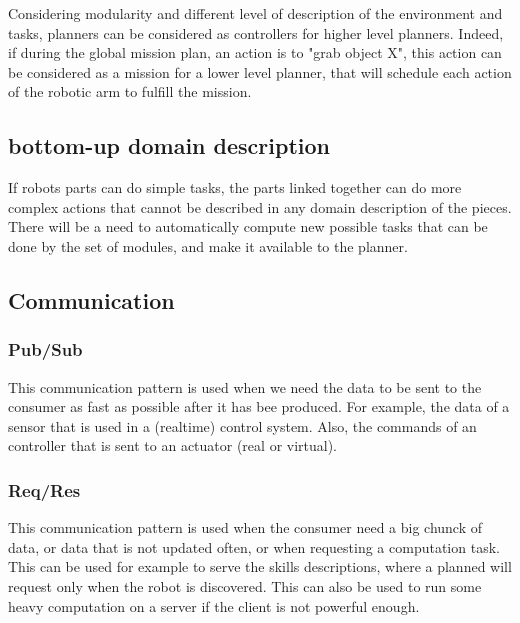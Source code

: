 Considering modularity and different level of description of the environment and tasks, planners can be considered as controllers for higher level planners.
Indeed, if during the global mission plan, an action is to "grab object X", this action can be considered as a mission for a lower level planner, that will schedule each action of the robotic arm to fulfill the mission.

\subsection{bottom-up domain description}

If robots parts can do simple tasks, the parts linked together can do more complex actions that cannot be described in any domain description of the pieces.
There will be a need to automatically compute new possible tasks that can be done by the set of modules, and make it available to the planner.

\subsection{Communication}

\subsubsection{Pub/Sub}

This communication pattern is used when we need the data to be sent to the consumer as fast as possible after it has bee produced.
For example, the data of a sensor that is used in a (realtime) control system.
Also, the commands of an controller that is sent to an actuator (real or virtual).

\subsubsection{Req/Res}

This communication pattern is used when the consumer need a big chunck of data, or data that is not updated often, or when requesting a computation task.
This can be used for example to serve the skills descriptions, where a planned will request only when the robot is discovered.
This can also be used to run some heavy computation on a server if the client is not powerful enough.